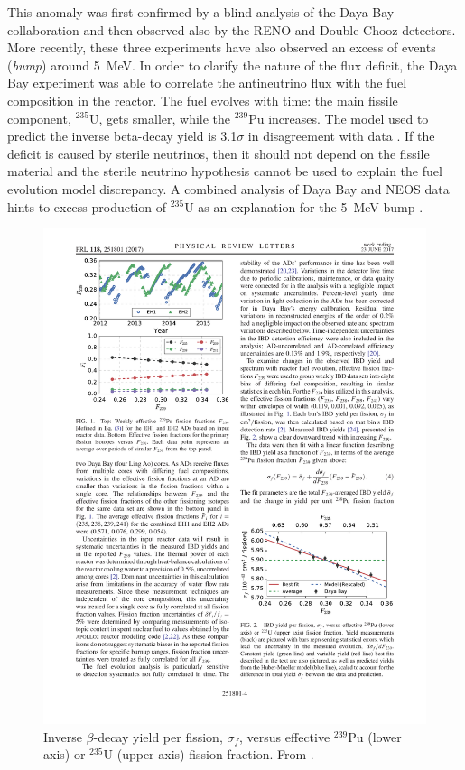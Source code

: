     This anomaly was first confirmed by a blind analysis of the Daya Bay collaboration \cite{An:2015nua} and then observed also by the RENO and Double Chooz detectors. More recently, these three experiments have also observed an excess of events (\emph{bump}) around 5~MeV. 
    In order to clarify the nature of the flux deficit, the Daya Bay experiment was able to correlate the antineutrino flux with the fuel composition in the reactor. The fuel evolves with time: the main fissile component, $^{235}$U, gets smaller, while the $^{239}$Pu increases. The model used to predict the inverse beta-decay yield is 3.1$\sigma$ in disagreement with data \cite{An:2017osx}. If the deficit is caused by sterile neutrinos, then it should not depend on the fissile material and the sterile neutrino hypothesis cannot be used to explain the fuel evolution model discrepancy. A combined analysis of Daya Bay and NEOS data hints to excess production of $^{235}$U as an explanation for the 5~MeV bump \cite{Huber:2016xis}. 
    
    \begin{figure}[htbp]
      \centering
      \includegraphics[width=0.75\linewidth]{figures/dayabay.pdf}
      \caption{Inverse $\beta$-decay yield per fission, $\sigma_f$, versus effective $^{239}$Pu (lower axis) or $^{235}$U (upper axis) fission fraction. From \cite{An:2017osx}.}
    \label{fig:dayabay}
    \end{figure}
    
